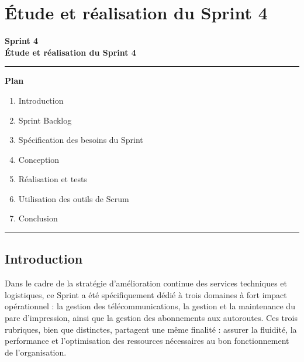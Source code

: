 \documentclass[a4paper,11pt]{report}
\begin{document}
\newpage

\chapter{Étude et réalisation du Sprint 4}
\thispagestyle{empty}

\vspace{2cm}
\begin{center}
  {\Huge\bfseries Sprint 4}\\[0.8em]
  {\LARGE\bfseries Étude et réalisation du Sprint 4}
\end{center}

\vspace{1.5cm}
\begin{center}
  \color{blue!60!black}\rule{0.6\textwidth}{1pt}
\end{center}
\vspace{1.5cm}

\begin{center}
  {\huge\bfseries Plan}\\[0.5em]
\end{center}
\vspace{1em}

\begin{enumerate}[%
  label=\bfseries\Large\arabic*., 
  leftmargin=2cm, 
  itemsep=1em
]
   \item Introduction
  \item Sprint Backlog
  \item Spécification des besoins du Sprint
  \item Conception
  \item Réalisation et tests
  \item Utilisation des outils de Scrum
  \item Conclusion
\end{enumerate}

\vfill
\begin{center}
  \color{blue!60!black}\rule{0.6\textwidth}{0.8pt}
\end{center}

\newpage
\setcounter{section}{0}

\section{Introduction}

Dans le cadre de la stratégie d’amélioration continue des services techniques et logistiques, ce Sprint a été spécifiquement dédié à trois domaines à fort impact opérationnel : la gestion des télécommunications, la gestion et la maintenance du parc d’impression, ainsi que la gestion des abonnements aux autoroutes. Ces trois rubriques, bien que distinctes, partagent une même finalité : assurer la fluidité, la performance et l’optimisation des ressources nécessaires au bon fonctionnement de l'organisation.
\end{document}
